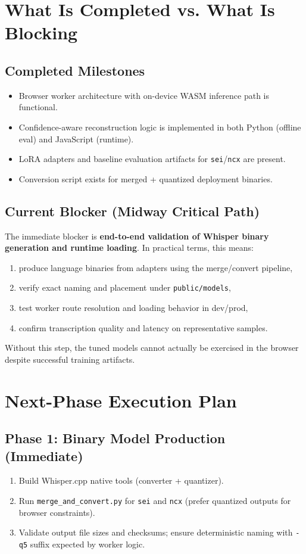 \documentclass[11pt]{article}
\begin{document}
\section{What Is Completed vs. What Is Blocking}
\subsection{Completed Milestones}
\begin{itemize}
    \item Browser worker architecture with on-device WASM inference path is functional.
    \item Confidence-aware reconstruction logic is implemented in both Python (offline eval) and JavaScript (runtime).
    \item LoRA adapters and baseline evaluation artifacts for \texttt{sei}/\texttt{ncx} are present.
    \item Conversion script exists for merged + quantized deployment binaries.
\end{itemize}

\subsection{Current Blocker (Midway Critical Path)}
The immediate blocker is \textbf{end-to-end validation of Whisper binary generation and runtime loading}. In practical terms, this means:
\begin{enumerate}
    \item produce language binaries from adapters using the merge/convert pipeline,
    \item verify exact naming and placement under \texttt{public/models},
    \item test worker route resolution and loading behavior in dev/prod,
    \item confirm transcription quality and latency on representative samples.
\end{enumerate}

Without this step, the tuned models cannot actually be exercised in the browser despite successful training artifacts.

\section{Next-Phase Execution Plan}
\subsection{Phase 1: Binary Model Production (Immediate)}
\begin{enumerate}
    \item Build Whisper.cpp native tools (converter + quantizer).
    \item Run \texttt{merge\_and\_convert.py} for \texttt{sei} and \texttt{ncx} (prefer quantized outputs for browser constraints).
    \item Validate output file sizes and checksums; ensure deterministic naming with \texttt{-q5} suffix expected by worker logic.
\end{enumerate}
\end{document}
